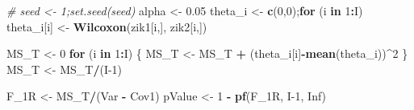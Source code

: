 \documentclass[
]{book}
\newenvironment{Shaded}{\begin{snugshade}}{\end{snugshade}}
\newcommand{\CommentTok}[1]{\textcolor[rgb]{0.56,0.35,0.01}{\textit{#1}}}
\newcommand{\ControlFlowTok}[1]{\textcolor[rgb]{0.13,0.29,0.53}{\textbf{#1}}}
\newcommand{\DecValTok}[1]{\textcolor[rgb]{0.00,0.00,0.81}{#1}}
\newcommand{\FloatTok}[1]{\textcolor[rgb]{0.00,0.00,0.81}{#1}}
\newcommand{\KeywordTok}[1]{\textcolor[rgb]{0.13,0.29,0.53}{\textbf{#1}}}
\newcommand{\NormalTok}[1]{#1}
\newcommand{\OperatorTok}[1]{\textcolor[rgb]{0.81,0.36,0.00}{\textbf{#1}}}
\newcommand{\OtherTok}[1]{\textcolor[rgb]{0.56,0.35,0.01}{#1}}
\newcommand{\StringTok}[1]{\textcolor[rgb]{0.31,0.60,0.02}{#1}}
\begin{document}
\begin{Shaded}
\begin{Highlighting}[]
\CommentTok{\# seed \textless{}{-} 1;set.seed(seed)}
\NormalTok{alpha \textless{}{-}}\StringTok{ }\FloatTok{0.05}
\NormalTok{theta\_i \textless{}{-}}\StringTok{ }\KeywordTok{c}\NormalTok{(}\DecValTok{0}\NormalTok{,}\DecValTok{0}\NormalTok{);}\ControlFlowTok{for}\NormalTok{ (i }\ControlFlowTok{in} \DecValTok{1}\OperatorTok{:}\NormalTok{I) theta\_i[i] \textless{}{-}}\StringTok{ }\KeywordTok{Wilcoxon}\NormalTok{(zik1[i,], zik2[i,])}

\NormalTok{MS\_T \textless{}{-}}\StringTok{ }\DecValTok{0}
\ControlFlowTok{for}\NormalTok{ (i }\ControlFlowTok{in} \DecValTok{1}\OperatorTok{:}\NormalTok{I) \{}
\NormalTok{  MS\_T \textless{}{-}}\StringTok{ }\NormalTok{MS\_T }\OperatorTok{+}\StringTok{ }\NormalTok{(theta\_i[i]}\OperatorTok{{-}}\KeywordTok{mean}\NormalTok{(theta\_i))}\OperatorTok{\^{}}\DecValTok{2}
\NormalTok{\}}
\NormalTok{MS\_T \textless{}{-}}\StringTok{ }\NormalTok{MS\_T}\OperatorTok{/}\NormalTok{(I}\DecValTok{{-}1}\NormalTok{)}

\NormalTok{F\_1R \textless{}{-}}\StringTok{ }\NormalTok{MS\_T}\OperatorTok{/}\NormalTok{(Var }\OperatorTok{{-}}\StringTok{ }\NormalTok{Cov1)}
\NormalTok{pValue \textless{}{-}}\StringTok{ }\DecValTok{1} \OperatorTok{{-}}\StringTok{ }\KeywordTok{pf}\NormalTok{(F\_1R, I}\DecValTok{{-}1}\NormalTok{, }\OtherTok{Inf}\NormalTok{)}


\end{Highlighting}
\end{Shaded}
\end{document}
